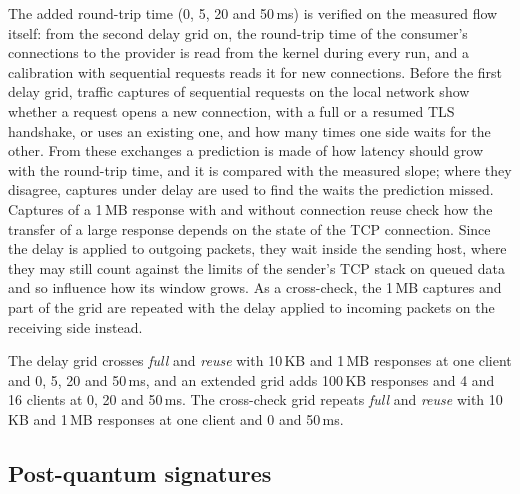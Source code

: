 \documentclass[conference,a4paper]{IEEEtran}
\newcommand{\newtext}[1]{{\color{blue}#1}}
\begin{document}
The added round-trip time (0, 5, 20 and 50\,ms) is verified on the measured flow itself: from the
second delay grid on, the round-trip time of the consumer's connections to the provider is read from
the kernel during every run, and a calibration with sequential requests reads it for new connections.
Before the first delay grid, traffic captures of sequential requests on the local network show
whether a request opens a new connection, with a full or a resumed TLS handshake, or uses an existing
one, and how many times one side waits for the other. From these exchanges a prediction is made of how
latency should grow with the round-trip time, and it is compared with the measured slope; where they
disagree, captures under delay are used to find the waits the prediction missed. Captures of a 1\,MB
response with and without connection reuse check how the transfer of a large response depends on the
state of the TCP connection. Since the delay is applied to outgoing packets, they wait inside the
sending host, where they may still count against the limits of the sender's TCP stack on queued data
and so influence how its window grows. As a cross-check, the 1\,MB captures and part of the grid are
repeated with the delay applied to incoming packets on the receiving side instead.

The delay grid crosses \emph{full} and \emph{reuse} with 10\,KB and 1\,MB responses at one client
and 0, 5, 20 and 50\,ms, and an extended grid adds 100\,KB responses and 4 and 16 clients at 0, 20
and 50\,ms. The cross-check grid repeats \emph{full} and \emph{reuse} with 10\,KB and 1\,MB
responses at one client and 0 and 50\,ms.

\subsection{\newtext{Post-quantum signatures}}\label{sec:pqmethod}
\end{document}
